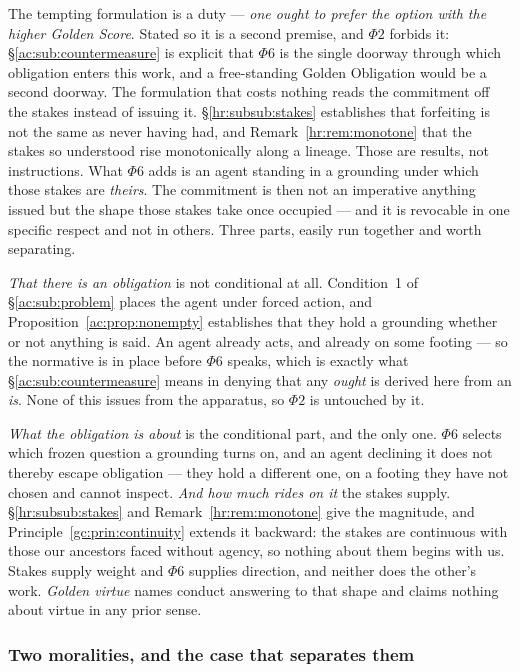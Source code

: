 \documentclass[11pt]{article}
\numberwithin{equation}{section}
\theoremstyle{plain}
\theoremstyle{definition}
\theoremstyle{remark}
\begin{document}
The tempting formulation is a duty --- \emph{one ought to prefer the
option with the higher Golden Score}. Stated so it is a second premise,
and $\Phi2$ forbids it: \S\ref{ac:sub:countermeasure} is explicit that
$\Phi6$ is the single doorway through which obligation enters this work,
and a free-standing Golden Obligation would be a second doorway. The formulation that costs nothing reads the commitment off the stakes
instead of issuing it. \S\ref{hr:subsub:stakes} establishes that
forfeiting is not the same as never having had, and
Remark~\ref{hr:rem:monotone} that the stakes so understood rise
monotonically along a lineage. Those are results, not instructions. What
$\Phi6$ adds is an agent standing in a grounding under which those stakes
are \emph{theirs}. The commitment is then not an imperative anything
issued but the shape those stakes take once occupied --- and it is
revocable in one specific respect and not in others. Three parts, easily
run together and worth separating.

\emph{That there is an obligation} is not conditional at all. Condition~1
of \S\ref{ac:sub:problem} places the agent under forced action, and
Proposition~\ref{ac:prop:nonempty} establishes that they hold a grounding
whether or not anything is said. An agent already acts, and already on
some footing --- so the normative is in place before $\Phi6$ speaks,
which is exactly what \S\ref{ac:sub:countermeasure} means in denying that
any \emph{ought} is derived here from an \emph{is}. None of this issues
from the apparatus, so $\Phi2$ is untouched by it.

\emph{What the obligation is about} is the conditional part, and the only
one. $\Phi6$ selects which frozen question a grounding turns on, and an
agent declining it does not thereby escape obligation --- they hold a
different one, on a footing they have not chosen and cannot inspect. \emph{And how much rides on it} the stakes supply.
\S\ref{hr:subsub:stakes} and Remark~\ref{hr:rem:monotone} give the
magnitude, and Principle~\ref{gc:prin:continuity} extends it backward:
the stakes are continuous with those our ancestors faced without agency,
so nothing about them begins with us. Stakes supply weight and $\Phi6$
supplies direction, and neither does the other's work. \emph{Golden virtue} names conduct answering to that shape and
claims nothing about virtue in any prior sense.

\subsubsection{Two moralities, and the case that separates them}
\label{gs:ssub:twomoralities}
\end{document}
